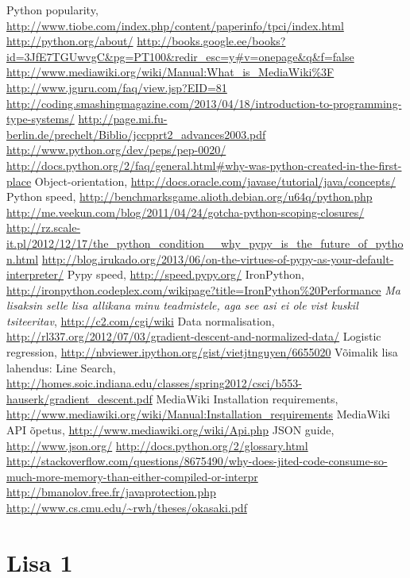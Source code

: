 \documentclass[12pt, a4paper, titlepage]{article}
\begin{document}
\begin{thebibliography}{99}
Python popularity,
\url{http://www.tiobe.com/index.php/content/paperinfo/tpci/index.html}
\bibitem{}
\url{http://python.org/about/}
\bibitem{}
\url{http://books.google.ee/books?id=3JfE7TGUwvgC&pg=PT100&redir_esc=y#v=onepage&q&f=false}
\bibitem{}
\url{http://www.mediawiki.org/wiki/Manual:What_is_MediaWiki%3F}
\bibitem{}
\url{http://www.jguru.com/faq/view.jsp?EID=81}
\bibitem{}
\url{http://coding.smashingmagazine.com/2013/04/18/introduction-to-programming-type-systems/}
\bibitem{}
\url{http://page.mi.fu-berlin.de/prechelt/Biblio/jccpprt2_advances2003.pdf}
\bibitem{}
\url{http://www.python.org/dev/peps/pep-0020/}
\bibitem{}
\url{http://docs.python.org/2/faq/general.html#why-was-python-created-in-the-first-place}
\bibitem{}
Object-orientation,
\url{http://docs.oracle.com/javase/tutorial/java/concepts/}
\bibitem{}
Python speed,
\url{http://benchmarksgame.alioth.debian.org/u64q/python.php}
\bibitem{}
\url{http://me.veekun.com/blog/2011/04/24/gotcha-python-scoping-closures/}
\bibitem{}
\url{http://rz.scale-it.pl/2012/12/17/the_python_condition__why_pypy_is_the_future_of_python.html}
\bibitem{}
\url{http://blog.irukado.org/2013/06/on-the-virtues-of-pypy-as-your-default-interpreter/}
\bibitem{}
Pypy speed,
\url{http://speed.pypy.org/}
\bibitem{}
IronPython,
\url{http://ironpython.codeplex.com/wikipage?title=IronPython%20Performance}
\bibitem{}
\emph{Ma lisaksin selle lisa allikana minu teadmistele, aga see asi ei ole vist
kuskil tsiteeritav},
\url{http://c2.com/cgi/wiki}
\bibitem{}
Data normalisation,
\url{http://rl337.org/2012/07/03/gradient-descent-and-normalized-data/}
Logistic regression,
\url{http://nbviewer.ipython.org/gist/vietjtnguyen/6655020}
\bibitem{}
Võimalik lisa lahendus: 
Line Search, 
\url{http://homes.soic.indiana.edu/classes/spring2012/csci/b553-hauserk/gradient_descent.pdf}
\bibitem{}
MediaWiki Installation requirements,
\url{http://www.mediawiki.org/wiki/Manual:Installation_requirements}
\bibitem{}
MediaWiki API õpetus,
\url{http://www.mediawiki.org/wiki/Api.php}
\bibitem{}
JSON guide,
\url{http://www.json.org/}
\url{http://docs.python.org/2/glossary.html}
\url{http://stackoverflow.com/questions/8675490/why-does-jited-code-consume-so-much-more-memory-than-either-compiled-or-interpr}
\url{http://bmanolov.free.fr/javaprotection.php}
\url{http://www.cs.cmu.edu/~rwh/theses/okasaki.pdf}
\end{thebibliography}

\section*{Lisa 1}
\end{document}
